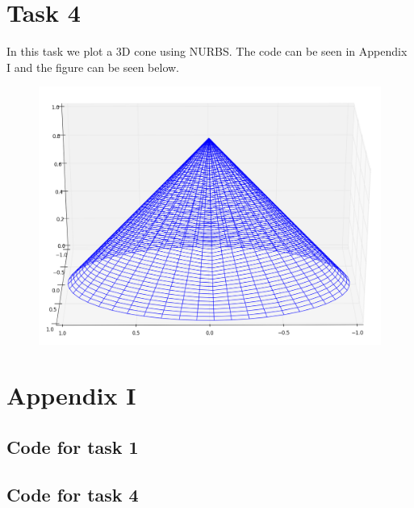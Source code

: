 \documentclass[]{article}
\begin{document}
\section*{Task 4}
In this task we plot a 3D cone using NURBS. The code can be seen in Appendix I and the figure can be seen below.\\

\begin{figure}[h!]
	\includegraphics[scale=0.3]{nurbscone}
\end{figure}

\newpage
\section*{Appendix I}
\subsection*{Code for task 1}


\subsection*{Code for task 4}

\end{document}
